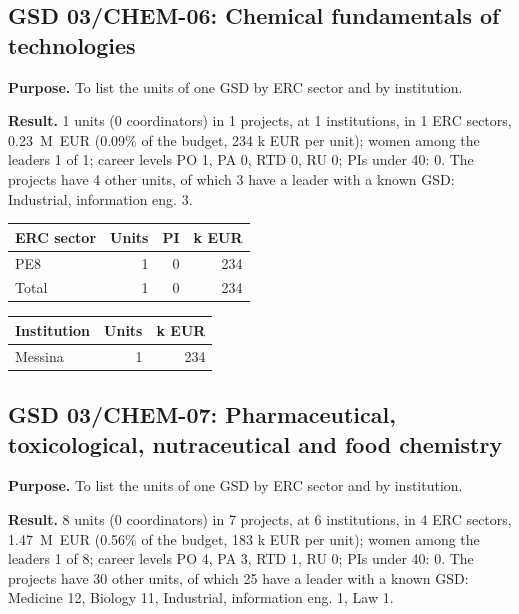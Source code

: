 \documentclass[11pt,a4paper]{article}
\begin{document}
\clearpage
\subsection{GSD 03/CHEM-06: Chemical fundamentals of technologies}
\textbf{Purpose.} To list the units of one GSD by ERC sector and by institution.

\textbf{Result.} 1 units (0 coordinators) in 1 projects, at 1 institutions, in 1 ERC sectors, 0.23~M~EUR (0.09\% of the budget, 234 k EUR per unit); women among the leaders 1 of 1; career levels PO 1, PA 0, RTD 0, RU 0; PIs under 40: 0. The projects have 4 other units, of which 3 have a leader with a known GSD: Industrial, information eng. 3.

{\footnotesize
\begin{longtable}{lrrr}
\toprule
ERC sector & Units & PI & k EUR \\
\midrule
\endhead
PE8 & 1 & 0 & 234 \\
\midrule
Total & 1 & 0 & 234 \\
\bottomrule
\end{longtable}
}
{\footnotesize
\begin{longtable}{lrr}
\toprule
Institution & Units & k EUR \\
\midrule
\endhead
Messina & 1 & 234 \\
\bottomrule
\end{longtable}
}

\clearpage
\subsection{GSD 03/CHEM-07: Pharmaceutical, toxicological, nutraceutical and food chemistry}
\textbf{Purpose.} To list the units of one GSD by ERC sector and by institution.

\textbf{Result.} 8 units (0 coordinators) in 7 projects, at 6 institutions, in 4 ERC sectors, 1.47~M~EUR (0.56\% of the budget, 183 k EUR per unit); women among the leaders 1 of 8; career levels PO 4, PA 3, RTD 1, RU 0; PIs under 40: 0. The projects have 30 other units, of which 25 have a leader with a known GSD: Medicine 12, Biology 11, Industrial, information eng. 1, Law 1.
\end{document}
